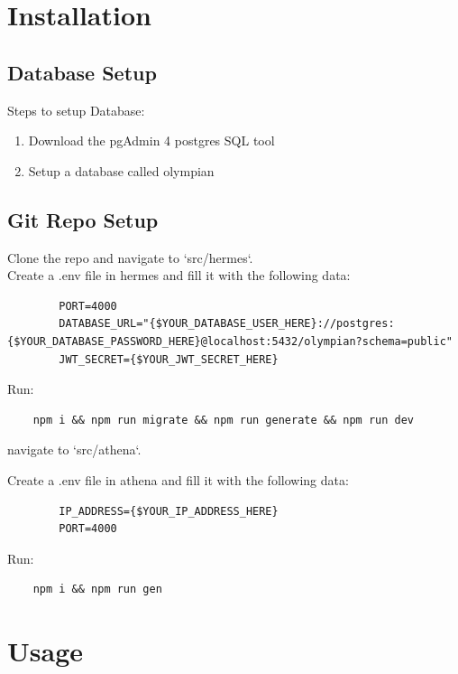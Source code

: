 \documentclass{article}
\begin{document}
\section{Installation}

\subsection{Database Setup}

Steps to setup Database:
\begin{enumerate}
    \item Download the pgAdmin 4 postgres SQL tool
    \item Setup a database called olympian
\end{enumerate}

\subsection{Git Repo Setup}
    Clone the repo and navigate to `src/hermes`.\\
    Create a .env file in hermes and fill it with the following data:

    \begin{verbatim}
        PORT=4000
        DATABASE_URL="{$YOUR_DATABASE_USER_HERE}://postgres:{$YOUR_DATABASE_PASSWORD_HERE}@localhost:5432/olympian?schema=public"
        JWT_SECRET={$YOUR_JWT_SECRET_HERE}
    \end{verbatim}

    Run:
    \begin{verbatim}
    npm i && npm run migrate && npm run generate && npm run dev
    \end{verbatim}

    navigate to `src/athena`. 
    
    Create a .env file in athena and fill it with the following data:

    \begin{verbatim}
        IP_ADDRESS={$YOUR_IP_ADDRESS_HERE}
        PORT=4000
    \end{verbatim}

    Run:
    \begin{verbatim}
    npm i && npm run gen
    \end{verbatim}

\section{Usage}
\end{document}
